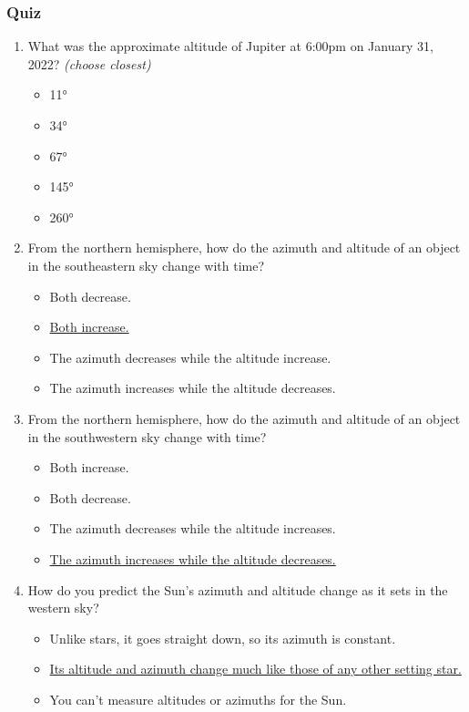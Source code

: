 \documentclass[12pt]{article}
\begin{document}
\subsubsection{Quiz}

\begin{enumerate}
\item%
What was the approximate altitude of Jupiter at 6:00pm on January 31, 2022? \emph{(choose closest)}
\begin{itemize}
    \item 11°
    \item 34°
    \item 67°
    \item 145°
    \item 260°
\end{itemize}
\item
From the northern hemisphere, how do the azimuth and altitude of an object in the southeastern sky change with time?
\begin{itemize}
    \item Both decrease.
    \item \underline{Both increase.}
    \item The azimuth decreases while the altitude increase.
    \item The azimuth increases while the altitude decreases.
\end{itemize}
\item
From the northern hemisphere, how do the azimuth and altitude of an object in the southwestern sky change with time?
\begin{itemize}
    \item Both increase.
    \item Both decrease.
    \item The azimuth decreases while the altitude increases.
    \item \underline{The azimuth increases while the altitude decreases.}
\end{itemize}
\item
How do you predict the Sun's azimuth and altitude change as it sets in the western sky?
\begin{itemize}
    \item Unlike stars, it goes straight down, so its azimuth is constant.
    \item \underline{Its altitude and azimuth change much like those of any other setting star.}
    \item You can't measure altitudes or azimuths for the Sun.
\end{itemize}
\end{enumerate}
\end{document}
